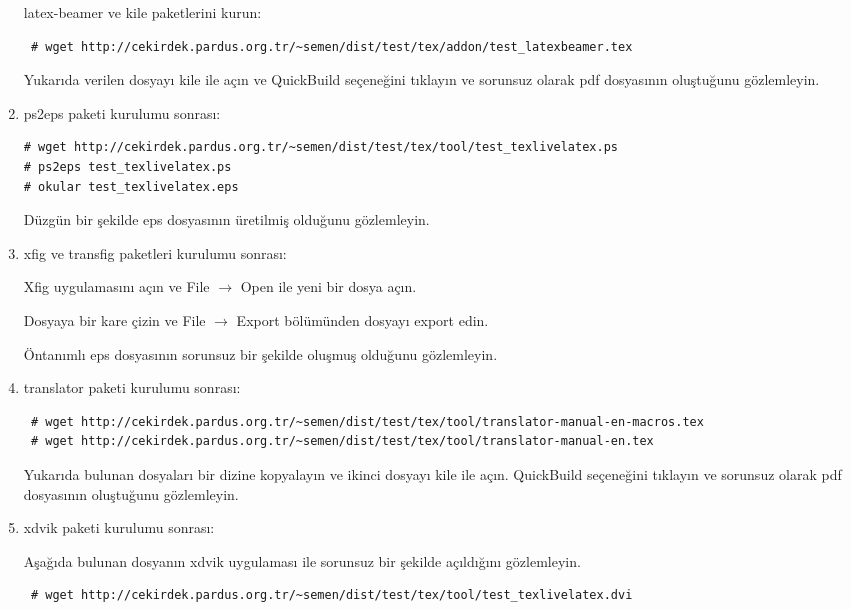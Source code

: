 \documentclass[a4paper,10pt]{article}
\begin{document}
\begin{enumerate}
latex-beamer ve kile paketlerini kurun:
\begin{verbatim}
 # wget http://cekirdek.pardus.org.tr/~semen/dist/test/tex/addon/test_latexbeamer.tex
\end{verbatim}

Yukarıda verilen dosyayı kile ile açın ve QuickBuild  seçeneğini tıklayın ve sorunsuz olarak pdf dosyasının oluştuğunu gözlemleyin.

\item ps2eps paketi kurulumu sonrası:

\begin{verbatim}
# wget http://cekirdek.pardus.org.tr/~semen/dist/test/tex/tool/test_texlivelatex.ps
# ps2eps test_texlivelatex.ps
# okular test_texlivelatex.eps
\end{verbatim}

Düzgün bir şekilde eps dosyasının üretilmiş olduğunu gözlemleyin.
\item xfig ve transfig paketleri kurulumu sonrası:

Xfig uygulamasını açın ve File $\rightarrow$ Open ile yeni bir dosya açın.

Dosyaya bir kare çizin ve File $\rightarrow$ Export bölümünden dosyayı export edin.

Öntanımlı eps dosyasının sorunsuz bir şekilde oluşmuş olduğunu gözlemleyin.

\item translator paketi kurulumu sonrası:
\begin{verbatim}
 # wget http://cekirdek.pardus.org.tr/~semen/dist/test/tex/tool/translator-manual-en-macros.tex
 # wget http://cekirdek.pardus.org.tr/~semen/dist/test/tex/tool/translator-manual-en.tex
\end{verbatim}

Yukarıda bulunan dosyaları bir dizine kopyalayın ve ikinci dosyayı kile ile açın. QuickBuild  seçeneğini tıklayın ve sorunsuz olarak pdf dosyasının oluştuğunu gözlemleyin.
\item xdvik paketi kurulumu sonrası:

Aşağıda bulunan dosyanın xdvik uygulaması ile sorunsuz bir şekilde açıldığını gözlemleyin.
\begin{verbatim}
 # wget http://cekirdek.pardus.org.tr/~semen/dist/test/tex/tool/test_texlivelatex.dvi
 \end{verbatim}

\end{enumerate}
\end{document}
